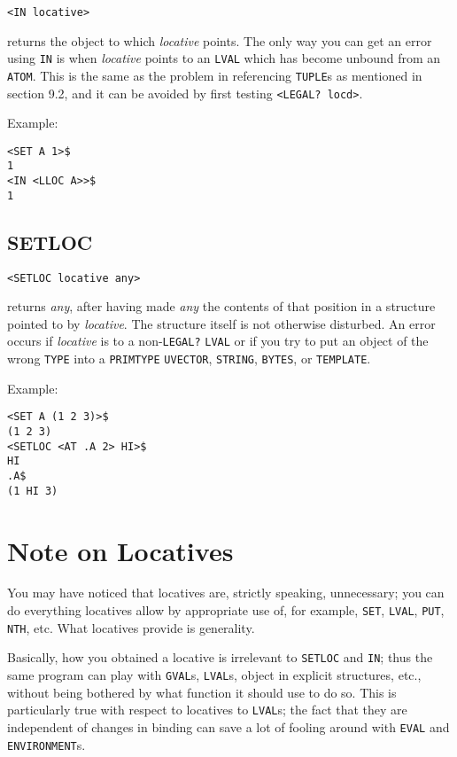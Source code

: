 \documentclass[a4paper]{scrbook}
\begin{document}
\begin{verbatim}
<IN locative>
\end{verbatim}

 returns the object to which \emph{locative} points. The only way you can get an error using
\texttt{IN} is when \emph{locative} points to an \texttt{LVAL} which has become unbound from an \texttt{ATOM}. This is the
same as the problem in referencing \texttt{TUPLE}s as mentioned in section 9.2, and it can be avoided by first testing
\texttt{\textless{}LEGAL?\ locd\textgreater{}}.

Example:

\begin{verbatim}
<SET A 1>$
1
<IN <LLOC A>>$
1
\end{verbatim}

\subsection{SETLOC}\label{setloc}

\begin{verbatim}
<SETLOC locative any>
\end{verbatim}

 returns \emph{any}, after having made \emph{any} the contents of that position in a
structure pointed to by \emph{locative}. The structure itself is not otherwise disturbed. An error occurs if
\emph{locative} is to a non-\texttt{LEGAL?} \texttt{LVAL} or if you try to put an object of the wrong \texttt{TYPE} into a
\texttt{PRIMTYPE} \texttt{UVECTOR}, \texttt{STRING}, \texttt{BYTES}, or \texttt{TEMPLATE}.

Example:

\begin{verbatim}
<SET A (1 2 3)>$
(1 2 3)
<SETLOC <AT .A 2> HI>$
HI
.A$
(1 HI 3)
\end{verbatim}

\section{Note on Locatives}\label{note-on-locatives}

You may have noticed that locatives are, strictly speaking, unnecessary; you can do everything locatives allow by
appropriate use of, for example, \texttt{SET}, \texttt{LVAL}, \texttt{PUT}, \texttt{NTH}, etc. What
locatives provide is generality.

Basically, how you obtained a locative is irrelevant to \texttt{SETLOC}  and
\texttt{IN}; thus the same program can play with \texttt{GVAL}s, \texttt{LVAL}s, object in explicit
structures, etc., without being bothered by what function it should use to do so. This is particularly true with respect to
locatives to \texttt{LVAL}s; the fact that they are independent of changes in binding can save a lot of fooling around with
\texttt{EVAL} and \texttt{ENVIRONMENT}s.
\end{document}
